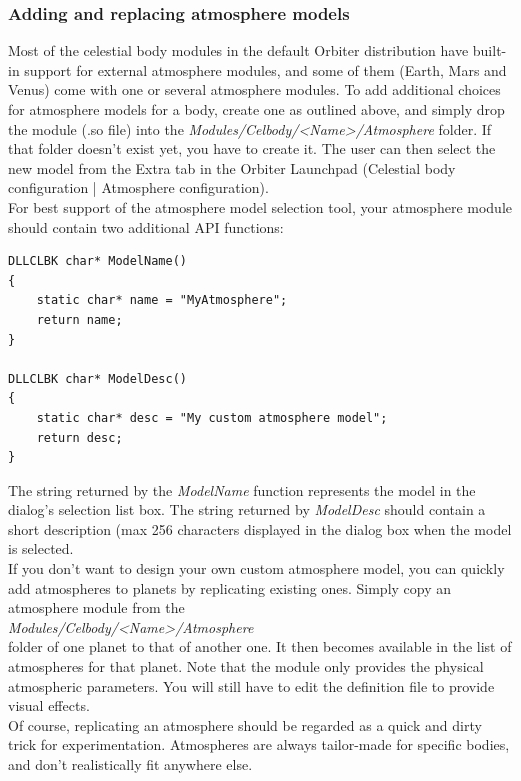 \documentclass[Orbiter Developer Manual.tex]{subfiles}
\begin{document}
\subsubsection{Adding and replacing atmosphere models}
Most of the celestial body modules in the default Orbiter distribution have built-in support for external atmosphere modules, and some of them (Earth, Mars and Venus) come with one or several atmosphere modules. To add additional choices for atmosphere models for a body, create one as outlined above, and simply drop the module (.so file) into the \textit{Modules/Celbody/<Name>/Atmosphere} folder. If that folder doesn't exist yet, you have to create it. The user can then select the new model from the Extra tab in the Orbiter Launchpad (Celestial body configuration | Atmosphere configuration).\\
For best support of the atmosphere model selection tool, your atmosphere module should contain two additional API functions:

\begin{lstlisting}
DLLCLBK char* ModelName()
{
	static char* name = "MyAtmosphere";
	return name;
}

DLLCLBK char* ModelDesc()
{
	static char* desc = "My custom atmosphere model";
	return desc;
}
\end{lstlisting}

\noindent
The string returned by the \textit{ModelName} function represents the model in the dialog's selection list box. The string returned by \textit{ModelDesc} should contain a short description (max 256 characters displayed in the dialog box when the model is selected.\\
If you don't want to design your own custom atmosphere model, you can quickly add atmospheres to planets by replicating existing ones. Simply copy an atmosphere module from the\\
\indent \textit{Modules/Celbody/<Name>/Atmosphere}\\
folder of one planet to that of another one. It then becomes available in the list of atmospheres for that planet. Note that the module only provides the physical atmospheric parameters. You will still have to edit the definition file to provide visual effects.\\
Of course, replicating an atmosphere should be regarded as a quick and dirty trick for experimentation. Atmospheres are always tailor-made for specific bodies, and don't realistically fit anywhere else.
\end{document}

